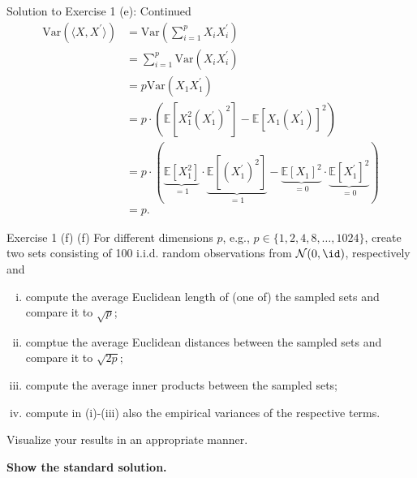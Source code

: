 \documentclass[aspectratio=169]{beamer}
\renewcommand{\E}{\mathbb{E}}
\newcommand{\Var}[1]{\mathrm{Var}(#1)}
\newcommand{\sumip}{\sum_{i=1}^p}
\newcommand{\Xp}{X^\prime}
\begin{document}
\begin{frame}{Solution to Exercise 1 (e): Continued}
	\begin{align*}
		\Var{\langle X, \Xp \rangle} &= \Var{\sumip X_i \Xp_i} \\
		&= \sumip \Var{X_i \Xp_i} \\
		&= p \Var{X_1 \Xp_1} \\
		&= p\cdot (\E[X_1^2 (\Xp_1)^2] - \E[X_1 (\Xp_1)]^2) \\
		&= p \cdot (\underbrace{\E[X_1^2]}_{=1} \cdot \underbrace{\E[(\Xp_1)^2]}_{=1} - \underbrace{\E[X_1]^2}_{=0} \cdot \underbrace{\E[\Xp_1]^2}_{=0}) \\
		&= p.
	\end{align*}
\end{frame}

\begin{frame}{Exercise 1 (f)}
	(f) For different dimensions $p$, e.g., $p \in \{1, 2, 4, 8, \ldots, 1024\}$, create two sets consisting of 100 i.i.d. random observations from $\mathcal{N}(0, \id)$, respectively and 
	\begin{enumerate}[(i)]
		\item compute the average Euclidean length of (one of) the sampled sets and compare it to $\sqrt{p}$;
		\item comptue the average Euclidean distances between the sampled sets and compare it to $\sqrt{2p}$;
		\item compute the average inner products between the sampled sets;
		\item compute in (i)-(iii) also the empirical variances of the respective terms.
	\end{enumerate}
	Visualize your results in an appropriate manner.
	
	\textbf{Show the standard solution.}
\end{frame}
\end{document}
